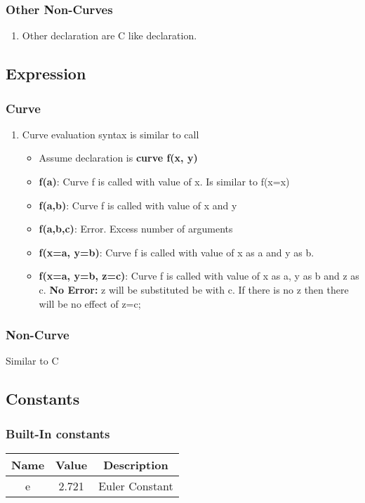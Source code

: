 \documentclass[12pt]{article}
\begin{document}
    \subsubsection{Other Non-Curves}
    \begin{enumerate}
        \item Other declaration are C like declaration.
    \end{enumerate}
    \subsection{Expression}
    \subsubsection{Curve}
    \begin{enumerate}
        \item Curve evaluation syntax is similar to call
            \begin{itemize}
                \item Assume declaration is \textbf{curve f(x, y)}
                \item \textbf{f(a)}: Curve f is called with value of x. Is similar to f(x=x)
                \item \textbf{f(a,b)}: Curve f is called with value of x and y
                \item \textbf{f(a,b,c)}: Error. Excess number of arguments
                \item \textbf{f(x=a, y=b)}: Curve f is called with value of x as a and y as b.
                \item \textbf{f(x=a, y=b, z=c)}: Curve f is called with value of x as a, y as b and z as c. \textbf{No Error:}
                    z will be substituted be with c. If there is no z then there will be no effect of z=c;
            \end{itemize}
    \end{enumerate}
    \subsubsection{Non-Curve}
    Similar to C
    \subsection{Constants}

    \subsubsection{Built-In constants}
    \begin{table}[H]
        \centering
        \begin{tabular}{|c|c|c|}
            \hline
            \textbf{Name} & \textbf{Value} & \textbf{Description} \\
            \hline
            e&  2.721 & Euler Constant  \\
            \hline
        \end{tabular}
    \end{table}
\end{document}
